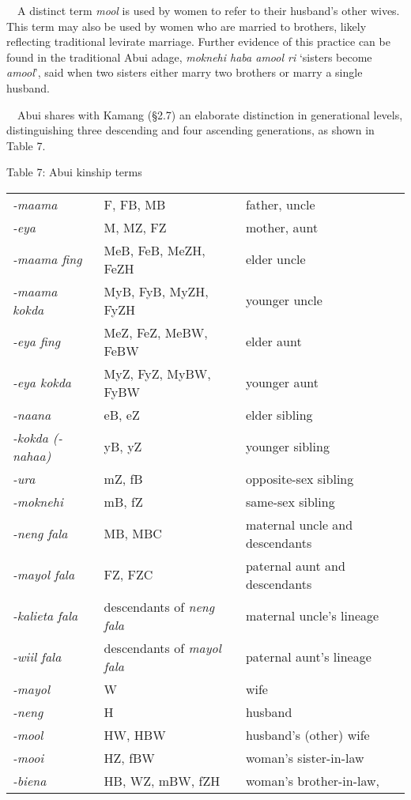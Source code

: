 \ \ A distinct term \textit{mool }is used by women to refer to their husband{\textquoteright}s other wives. This term may also be used by women who are married to brothers, likely reflecting traditional levirate marriage. Further evidence of this practice can be found in the traditional Abui adage, \textit{moknehi haba amool ri} {\textquoteleft}sisters become \textit{amool}{\textquoteright}, said when two sisters either marry two brothers or marry a single husband. 

\ \ Abui shares with Kamang ({\S}2.7) an elaborate distinction in generational levels, distinguishing three descending and four ascending generations, as shown in Table 7.

{\centering
Table 7: Abui kinship terms
\par}

\begin{center}
\tablehead{}
\begin{supertabular}{m{1.1490599in}m{2.4587598in}m{2.18796in}}
\textit{{}-maama} &
F, FB, MB &
father, uncle\\
\textit{{}-eya} &
M, MZ, FZ &
mother, aunt\\
\textit{{}-maama fing} &
MeB, FeB, MeZH, FeZH &
elder uncle\\
\textit{{}-maama kokda} &
MyB, FyB, MyZH, FyZH &
younger uncle\\
\textit{{}-eya fing} &
MeZ, FeZ, MeBW, FeBW &
elder aunt\\
\textit{{}-eya kokda} &
MyZ, FyZ, MyBW, FyBW &
younger aunt\\
\textit{{}-naana} &
eB, eZ &
elder sibling\\
\textit{{}-kokda (-nahaa)} &
yB, yZ &
younger sibling\\
\textit{{}-ura} &
mZ, fB &
opposite-sex sibling\\
\textit{{}-moknehi} &
mB, fZ &
same-sex sibling\\
\textit{{}-neng fala} &
MB, MBC &
maternal uncle and descendants\\
\textit{{}-mayol fala} &
FZ, FZC &
paternal aunt and descendants\\
\textit{{}-kalieta fala} &
descendants of \textit{neng fala} &
maternal uncle{\textquoteright}s lineage\\
\textit{{}-wiil fala} &
descendants of \textit{mayol fala} &
paternal aunt{\textquoteright}s lineage\\
\textit{{}-mayol} &
W &
wife\\
\textit{{}-neng} &
H &
husband\\
\textit{{}-mool} &
HW, HBW &
husband{\textquoteright}s (other) wife\\
\textit{{}-mooi} &
HZ, fBW &
woman{\textquoteright}s sister-in-law\\
\textit{{}-biena} &
HB, WZ, mBW, fZH &
woman{\textquoteright}s brother-in-law, 


\end{supertabular}
\end{center}
